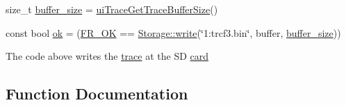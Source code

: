 \begin{DoxyCompactItemize}
\item 
size\+\_\+t \hyperlink{trace_2readme_8txt_a799a743b3abd553a37fc01ad3097df08}{buffer\+\_\+size} = \hyperlink{trcUser_8h_a031796f64e2393ebeb4dfc424cf3c3ae}{ui\+Trace\+Get\+Trace\+Buffer\+Size}()
\item 
const bool \hyperlink{trace_2readme_8txt_ab1dec86efb716110c1bbcfec4dda55f1}{ok} = (\hyperlink{ff_8h_a49d0171ecbd362cda5680a0d360db44ca62fce5cd9df008f8fc85f99706bda5f1}{F\+R\+\_\+\+OK} == \hyperlink{classStorage_a0194f1c6e14b23a759685a88c2e1bf0c}{Storage\+::write}(\char`\"{}1\+:trcf3.\+bin\char`\"{}, buffer, \hyperlink{trace_2readme_8txt_a799a743b3abd553a37fc01ad3097df08}{buffer\+\_\+size}))
\item 
The code above writes the \hyperlink{trace_2readme_8txt_aab7bcc83643280624f762e053e1b2686}{trace} at the SD \hyperlink{trace_2readme_8txt_a0d1fd70c70215609966800df0223784b}{card}
\end{DoxyCompactItemize}


\subsection{Function Documentation}
